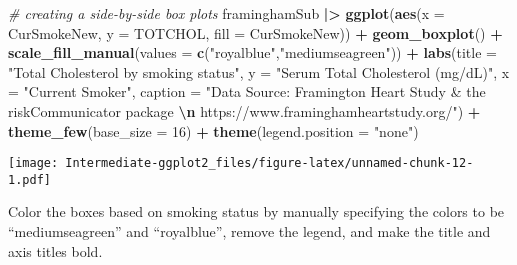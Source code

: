 \documentclass[
]{article}
\newenvironment{Shaded}{\begin{snugshade}}{\end{snugshade}}
\newcommand{\AttributeTok}[1]{\textcolor[rgb]{0.13,0.29,0.53}{#1}}
\newcommand{\CommentTok}[1]{\textcolor[rgb]{0.56,0.35,0.01}{\textit{#1}}}
\newcommand{\DecValTok}[1]{\textcolor[rgb]{0.00,0.00,0.81}{#1}}
\newcommand{\FunctionTok}[1]{\textcolor[rgb]{0.13,0.29,0.53}{\textbf{#1}}}
\newcommand{\NormalTok}[1]{#1}
\newcommand{\SpecialCharTok}[1]{\textcolor[rgb]{0.81,0.36,0.00}{\textbf{#1}}}
\newcommand{\StringTok}[1]{\textcolor[rgb]{0.31,0.60,0.02}{#1}}
\begin{document}
\begin{Shaded}
\begin{Highlighting}[]
\CommentTok{\# creating a side{-}by{-}side box plots}
\NormalTok{framinghamSub }\SpecialCharTok{|\textgreater{}}
  \FunctionTok{ggplot}\NormalTok{(}\FunctionTok{aes}\NormalTok{(}\AttributeTok{x =}\NormalTok{ CurSmokeNew, }\AttributeTok{y =}\NormalTok{ TOTCHOL, }\AttributeTok{fill =}\NormalTok{ CurSmokeNew)) }\SpecialCharTok{+}
  \FunctionTok{geom\_boxplot}\NormalTok{() }\SpecialCharTok{+}
  \FunctionTok{scale\_fill\_manual}\NormalTok{(}\AttributeTok{values =} \FunctionTok{c}\NormalTok{(}\StringTok{"royalblue"}\NormalTok{,}\StringTok{"mediumseagreen"}\NormalTok{)) }\SpecialCharTok{+}
  \FunctionTok{labs}\NormalTok{(}\AttributeTok{title =} \StringTok{"Total Cholesterol by smoking status"}\NormalTok{,}
       \AttributeTok{y =} \StringTok{"Serum Total Cholesterol (mg/dL)"}\NormalTok{,}
       \AttributeTok{x =} \StringTok{"Current Smoker"}\NormalTok{,}
       \AttributeTok{caption =} \StringTok{"Data Source: Framington Heart Study \& the riskCommunicator package }\SpecialCharTok{\textbackslash{}n}\StringTok{ https://www.framinghamheartstudy.org/"}\NormalTok{) }\SpecialCharTok{+}
  \FunctionTok{theme\_few}\NormalTok{(}\AttributeTok{base\_size =} \DecValTok{16}\NormalTok{) }\SpecialCharTok{+}
  \FunctionTok{theme}\NormalTok{(}\AttributeTok{legend.position =} \StringTok{"none"}\NormalTok{)}
\end{Highlighting}
\end{Shaded}

\texttt{[image: Intermediate-ggplot2\_files/figure-latex/unnamed-chunk-12-1.pdf]}

Color the boxes based on smoking status by manually specifying the
colors to be ``mediumseagreen'' and ``royalblue'', remove the legend,
and make the title and axis titles bold.
\end{document}
